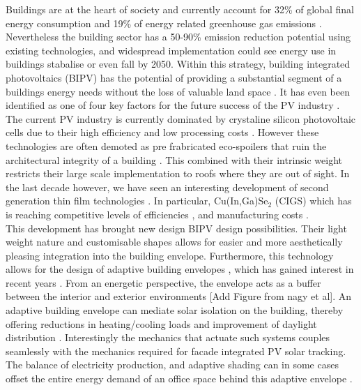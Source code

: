 
Buildings are at the heart of society and currently account for 32\% of global final energy consumption and 19\% of energy related greenhouse gas emissions \cite{IPCC}. Nevertheless the building sector has a 50-90\% emission reduction potential using existing technologies, and widespread implementation could see energy use in buildings stabalise or even fall by 2050. Within this strategy, building integrated photovoltaics (BIPV) has the potential of providing a substantial segment of a buildings energy needs without the loss of valuable land space \cite{Shoen1997}. It has even been identified as one of four key factors for the future success of the PV industry \cite{raugei2009life}. \\

The current PV industry is currently dominated by crystaline silicon photovoltaic cells due to their high efficiency and low processing costs \cite{saga2010advances}. However these technologies are often demoted as pre frabricated eco-spoilers that ruin the architectural integrity of a building \cite{Lueling2009ee}. This combined with their intrinsic weight restricts their large scale implementation to roofs where they are out of sight. In the last decade however, we have seen an interesting development of second generation thin film technologies \cite{NREL}. In particular, Cu(In,Ga)Se$_2$ (CIGS) which has is reaching  competitive levels of efficiencies \cite{kushiya2014cis}, and manufacturing costs \cite{kaelin2004low} \cite{jelle2012building}.\\

This development has brought new design BIPV design possibilities. Their light weight nature and customisable shapes allows for easier and more aesthetically pleasing integration into the building envelope. Furthermore, this technology allows for the design of adaptive building envelopes \cite{rossi2012adaptive}, which has gained interest in recent years \cite{loonen2013climate}. From an energetic perspective, the envelope acts as a buffer between the interior and exterior environments [Add Figure from nagy et al]. An adaptive building envelope can mediate solar isolation on the building, thereby offering reductions in heating/cooling loads and improvement of daylight distribution \cite{rossi2012adaptive}. Interestingly the mechanics that actuate such systems couples seamlessly with the mechanics required for facade integrated PV solar tracking. The balance of electricity production, and adaptive shading can in some cases offset the entire energy demand of an office space behind this adaptive envelope \cite{jayathissa2015abs}.\\

